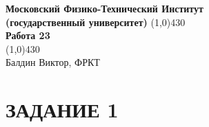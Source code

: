 \documentclass[a4paper, 12pt]{article}%
\begin{document}
\begin{titlepage}

\begin{center}
\large\textbf{Московский Физико-Технический Институт}\\
\large\textbf{(государственный университет)}
\vfill
\line(1,0){430}\\[1mm]
\huge\textbf{Работа 23}\\
\line(1,0){430}\\[1mm]
\vfill
\large Балдин Виктор, ФРКТ\\
\end{center}

\end{titlepage}

\section*{ЗАДАНИЕ 1}
\end{document}
